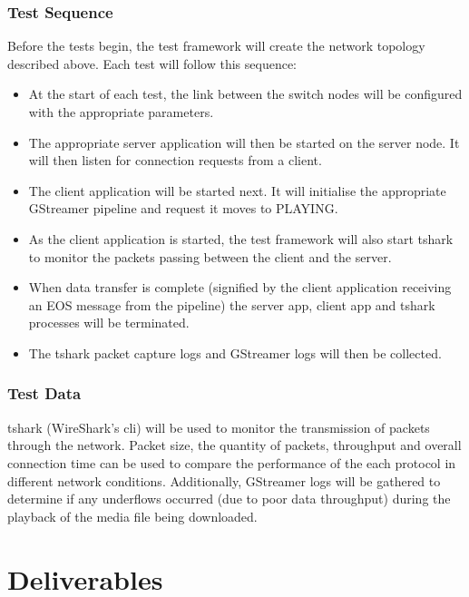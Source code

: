 \documentclass[11pt]{article}
\begin{document}
\subsubsection{Test Sequence}
Before the tests begin, the test framework will create the network topology described above. Each test will follow this sequence:

\begin{itemize}
    \item At the start of each test, the link between the switch nodes will be configured with the appropriate parameters.
    \item The appropriate server application will then be started on the server node. It will then listen for connection requests from a client.
    \item The client application will be started next. It will initialise the appropriate GStreamer pipeline and request it moves to PLAYING.
    \item As the client application is started, the test framework will also start tshark to monitor the packets passing between the client and the server.
    \item When data transfer is complete (signified by the client application receiving an EOS message from the pipeline) the server app, client app and tshark processes will be terminated.
    \item The tshark packet capture logs and GStreamer logs will then be collected.
\end{itemize}

\subsubsection{Test Data}

tshark (WireShark's cli) will be used to monitor the transmission of packets through the network. Packet size, the quantity of packets, throughput and overall connection time can be used to compare the performance of the each protocol in different network conditions. Additionally, GStreamer logs will be gathered to determine if any underflows occurred (due to poor data throughput) during the playback of the media file being downloaded.

\section{Deliverables}
\end{document}
